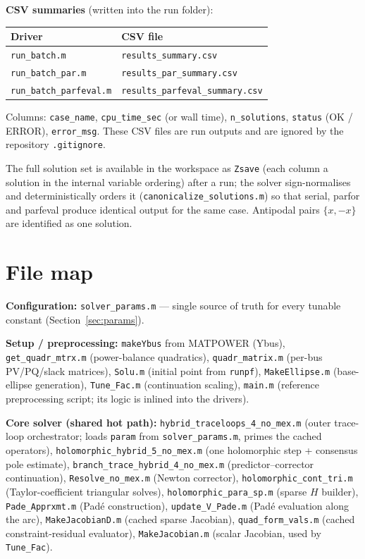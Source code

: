 \documentclass[11pt,a4paper]{article}
\newcommand{\code}[1]{\texttt{#1}}
\begin{document}
\textbf{CSV summaries} (written into the run folder):
\begin{center}\small
\begin{tabular}{@{}ll@{}}
\toprule
Driver & CSV file\\
\midrule
\code{run_batch.m}          & \code{results_summary.csv}\\
\code{run_batch_par.m}      & \code{results_par_summary.csv}\\
\code{run_batch_parfeval.m} & \code{results_parfeval_summary.csv}\\
\bottomrule
\end{tabular}
\end{center}
Columns: \code{case_name}, \code{cpu_time_sec} (or wall time), \code{n_solutions},
\code{status} (OK / ERROR), \code{error_msg}.
These CSV files are run outputs and are ignored by the repository \code{.gitignore}.

The full solution set is available in the workspace as \code{Zsave} (each column a
solution in the internal variable ordering) after a run; the solver sign-normalises and
deterministically orders it (\code{canonicalize_solutions.m}) so that serial, parfor and
parfeval produce identical output for the same case. Antipodal pairs $\{x,-x\}$ are
identified as one solution.

\section{File map}

\textbf{Configuration:} \code{solver_params.m} --- single source of truth for every
tunable constant (Section~\ref{sec:params}).

\textbf{Setup / preprocessing:}
\code{makeYbus} from MATPOWER (Ybus), \code{get_quadr_mtrx.m} (power-balance quadratics),
\code{quadr_matrix.m} (per-bus PV/PQ/slack matrices), \code{Solu.m} (initial point from
\code{runpf}), \code{MakeEllipse.m} (base-ellipse generation), \code{Tune_Fac.m}
(continuation scaling), \code{main.m} (reference preprocessing script; its logic is
inlined into the drivers).

\textbf{Core solver (shared hot path):}
\code{hybrid_traceloops_4_no_mex.m} (outer trace-loop orchestrator; loads \code{param}
from \code{solver_params.m}, primes the cached operators), \code{holomorphic_hybrid_5_no_mex.m} (one
holomorphic step + consensus pole estimate), \code{branch_trace_hybrid_4_no_mex.m}
(predictor--corrector continuation), \code{Resolve_no_mex.m} (Newton corrector),
\code{holomorphic_cont_tri.m} (Taylor-coefficient triangular solves),
\code{holomorphic_para_sp.m} (sparse $H$ builder), \code{Pade_Apprxmt.m} (Pad\'e
construction), \code{update_V_Pade.m} (Pad\'e evaluation along the arc),
\code{MakeJacobianD.m} (cached sparse Jacobian), \code{quad_form_vals.m} (cached
constraint-residual evaluator), \code{MakeJacobian.m} (scalar Jacobian, used by
\code{Tune_Fac}).
\end{document}
